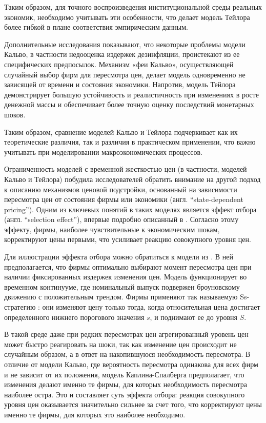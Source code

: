 Таким образом, для точного воспроизведения институциональной среды реальных экономик, необходимо учитывать эти особенности, что делает модель Тейлора более гибкой в плане соответствия эмпирическим данным.

Дополнительные исследования \cite{musy2006, benaissa2010} показывают, что некоторые проблемы модели Кальво, в частности недооценка издержек дезинфляции, проистекают из ее специфических предпосылок. Механизм «феи Кальво», осуществляющей случайный выбор фирм для пересмотра цен, делает модель одновременно не зависящей от времени и состояния экономики. Напротив, модель Тейлора демонстрирует большую устойчивость и реалистичность при изменениях в росте денежной массы и обеспечивает более точную оценку последствий монетарных шоков.

Таким образом, сравнение моделей Кальво и Тейлора подчеркивает как их теоретические различия, так и различия в практическом применении, что важно учитывать при моделировании макроэкономических процессов.

Ограниченность моделей с временной жесткостью цен (в частности, моделей Кальво и Тейлора) побудила исследователей обратить внимание на другой подход к описанию механизмов ценовой подстройки, основанный на зависимости пересмотра цен от состояния фирмы или экономики (англ. ``state-dependent pricing''). Одним из ключевых понятий в таких моделях является эффект отбора (англ. ``selection effect''), впервые подробно описанный в \cite{golosov2007}. Согласно этому эффекту, фирмы, наиболее чувствительные к экономическим шокам, корректируют цены первыми, что усиливает реакцию совокупного уровня цен.

Для иллюстрации эффекта отбора можно обратиться к модели из \cite{caplin1987}. В ней предполагается, что фирмы оптимально выбирают момент пересмотра цен при наличии фиксированных издержек изменения цен. Модель функционирует во временном континууме, где номинальный выпуск подвержен броуновскому движению с положительным трендом. Фирмы применяют так называемую Ss-стратегию \cite{sheshinski1977}: они изменяют цену только тогда, когда относительная цена достигает определенного нижнего порогового значения $s$, и поднимают ее до уровня $S$.

В такой среде даже при редких пересмотрах цен агрегированный уровень цен может быстро реагировать на шоки, так как изменение цен происходит не случайным образом, а в ответ на накопившуюся необходимость пересмотра. В отличие от модели Кальво, где вероятность пересмотра одинакова для всех фирм и не зависит от их положения, модель Каплина-Спалберга предполагает, что изменения делают именно те фирмы, для которых необходимость пересмотра наиболее остра. Это и составляет суть эффекта отбора: реакция совокупного уровня цен оказывается значительно сильнее за счет того, что корректируют цены именно те фирмы, для которых это наиболее необходимо.

